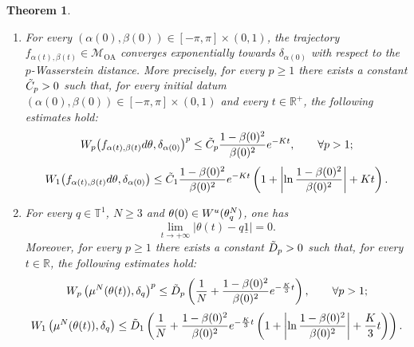 \documentclass[10pt,a4paper]{amsart}
\newtheorem{theorem}{Theorem}
\newcommand{\OA}{\mathcal{M}_{\mathrm{OA}}}
\newcommand{\R}{\mathbb{R}}
\newcommand{\T}{\mathbb{T}}
\renewcommand{\d}{\textnormal{d}}
\renewcommand{\u}{\textnormal{u}}
\begin{document}
\begin{theorem}\label{conv_rate_synchro}
\begin{enumerate} 
\item[i)] For every $(\alpha(0),\beta(0))\in[-\pi,\pi]\times(0,1)$, the trajectory $f_{\alpha(t),\beta(t)}\in\OA$ converges exponentially towards $\delta_{\alpha(0)}$ with respect to the $p$-Wasserstein distance. More precisely, for every $p\geq1$ there exists a constant $\Tilde{C}_p>0$ such that, for every initial datum $(\alpha(0),\beta(0))\in[-\pi,\pi]\times(0,1)$ and every $t\in\R^+$, the following estimates hold:
\begin{equation} W_p\big(f_{\alpha(t),\beta(t)}\d\theta,\delta_{\alpha(0)}\big)^p \leq \Tilde{C}_p\frac{1-\beta(0)^2}{\beta(0)^2} e^{-Kt}, \qquad \forall p>1; \end{equation} 
\begin{equation} W_1\big(f_{\alpha(t),\beta(t)}\d\theta,\delta_{\alpha(0)}\big) \leq \Tilde{C}_1 \frac{1-\beta(0)^2}{\beta(0)^2} e^{-Kt} \left( 1+\left|\ln\frac{1-\beta(0)^2}{\beta(0)^2}\right|+Kt \right). 
\end{equation} 
\item[ii)] For every $q\in\T^1$, $N\geq3$ and $\theta(0)\in W^\u(\theta^N_q)$, one has \[ \lim_{t\rightarrow+\infty}|\theta(t)-q\underline{1}|=0. \] Moreover, for every $p\geq1$ there exists a constant $\Tilde{D}_p>0$ such that, for every $t\in\R$, the following estimates hold:
\begin{equation} W_p\left(\mu^N(\theta(t)),\delta_{q}\right)^p \leq \Tilde{D}_p \left( \frac{1}{N} + \frac{1-\beta(0)^2}{\beta(0)^2} e^{-\frac{K}{3}t} \right), \qquad \forall p>1; \end{equation}
\begin{equation} W_1\left(\mu^N(\theta(t)),\delta_{q}\right) \leq \Tilde{D}_1 \left( \frac{1}{N} + \frac{1-\beta(0)^2}{\beta(0)^2} e^{-\frac{K}{3}t} \left( 1+\left|\ln \frac{1-\beta(0)^2}{\beta(0)^2}\right| +\frac{K}{3}t \right) \right).
\end{equation}
\end{enumerate}
\end{theorem}
\end{document}
